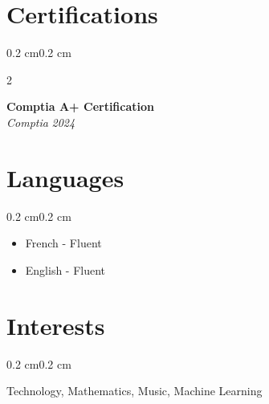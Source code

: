 \documentclass[10pt, letterpaper]{article}
\newenvironment{highlights}{%
    \begin{itemize}[
        topsep=0.10 cm,%
        parsep=0.10 cm,%
        partopsep=0pt,%
        itemsep=0pt,%
        leftmargin=0.4 cm + 10pt%
    ]
}{%
    \end{itemize}%
}
\newenvironment{onecolentry}{%
    \begin{adjustwidth}{0.2 cm}{0.2 cm}%
}{%
    \end{adjustwidth}%
}
\newenvironment{twocolentry}[2][]{%
    \begin{onecolentry}%
    \def\secondColumn{#2}%
    \begin{paracol}{2}%
}{%
    \switchcolumn%
    \raggedleft%
    \secondColumn%
    \end{paracol}%
    \end{onecolentry}%
}
\begin{document}
\section{Certifications}
\begin{twocolentry}{\textit{ 2024 }}
    \textbf{ Comptia A+ Certification }\\
    \textit{ Comptia }
\end{twocolentry}
\vspace{0.10 cm}

\section{Languages}
\begin{onecolentry}
    \begin{highlights}
        \item French - Fluent
        \item English - Fluent
    \end{highlights}
\end{onecolentry}

\section{Interests}
\begin{onecolentry}
    Technology, Mathematics, Music, Machine Learning
\end{onecolentry}
\end{document}
